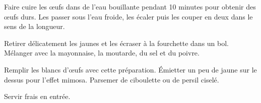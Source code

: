 \begin{nouvellerecette}


Faire cuire les œufs dans de l'eau bouillante pendant 10 minutes pour obtenir des œufs durs. Les passer sous l'eau froide, les écaler puis les couper en deux dans le sens de la longueur.

Retirer délicatement les jaunes et les écraser à la fourchette dans un bol. Mélanger avec la mayonnaise, la moutarde, du sel et du poivre.

Remplir les blancs d'œufs avec cette préparation. Émietter un peu de jaune sur le dessus pour l'effet mimosa. Parsemer de ciboulette ou de persil ciselé.

Servir frais en entrée.


\end{nouvellerecette}
